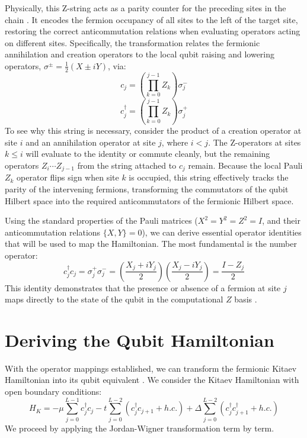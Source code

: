 \documentclass[11pt,a4paper]{article}
\begin{document}
Physically, this Z-string acts as a parity counter for the preceding sites in the chain \cite{JordanWigner1928}. It encodes the fermion occupancy of all sites to the left of the target site, restoring the correct anticommutation relations when evaluating operators acting on different sites. Specifically, the transformation relates the fermionic annihilation and creation operators to the local qubit raising and lowering operators, $\sigma^\pm = \frac{1}{2}(X \pm iY)$, via:
\begin{equation}
    c_j = \left(\prod_{k=0}^{j-1}Z_k\right)\sigma_j^- 
\end{equation}
\begin{equation}
    c_j^\dagger = \left(\prod_{k=0}^{j-1}Z_k\right)\sigma_j^+
\end{equation}
To see why this string is necessary, consider the product of a creation operator at site $i$ and an annihilation operator at site $j$, where $i < j$. The Z-operators at sites $k \le i$ will evaluate to the identity or commute cleanly, but the remaining operators $Z_{i}\cdots Z_{j-1}$ from the string attached to $c_j$ remain. Because the local Pauli $Z_k$ operator flips sign when site $k$ is occupied, this string effectively tracks the parity of the intervening fermions, transforming the commutators of the qubit Hilbert space into the required anticommutators of the fermionic Hilbert space.

Using the standard properties of the Pauli matrices ($X^2=Y^2=Z^2=I$, and their anticommutation relations $\{X, Y\} = 0$), we can derive essential operator identities that will be used to map the Hamiltonian. The most fundamental is the number operator:
\begin{equation}
    c_j^\dagger c_j = \sigma_j^+ \sigma_j^- = \left(\frac{X_j + iY_j}{2}\right)\left(\frac{X_j - iY_j}{2}\right) = \frac{I - Z_j}{2}
\end{equation}
This identity demonstrates that the presence or absence of a fermion at site $j$ maps directly to the state of the qubit in the computational $Z$ basis \cite{JordanWigner1928}.

\section{Deriving the Qubit Hamiltonian}

With the operator mappings established, we can transform the fermionic Kitaev Hamiltonian into its qubit equivalent \cite{Kitaev2001}. We consider the Kitaev Hamiltonian with open boundary conditions:
\begin{equation}
    H_K = -\mu \sum_{j=0}^{L-1} c_j^\dagger c_j - t \sum_{j=0}^{L-2} (c_j^\dagger c_{j+1} + h.c.) + \Delta \sum_{j=0}^{L-2} (c_j^\dagger c_{j+1}^\dagger + h.c.)
\end{equation}
We proceed by applying the Jordan-Wigner transformation term by term.
\end{document}
